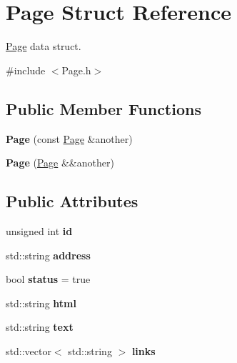 \hypertarget{structPage}{}\section{Page Struct Reference}
\label{structPage}


\hyperlink{structPage}{Page} data struct.  




{\ttfamily \#include $<$Page.\+h$>$}

\subsection*{Public Member Functions}
\begin{DoxyCompactItemize}
\item 
{\bfseries Page} (const \hyperlink{structPage}{Page} \&another)\hypertarget{structPage_a0029ba23e2303c20c550e201e24b2f7d}{}\label{structPage_a0029ba23e2303c20c550e201e24b2f7d}

\item 
{\bfseries Page} (\hyperlink{structPage}{Page} \&\&another)\hypertarget{structPage_a404fa3599cf2a9bfc900ca31f0bad9d2}{}\label{structPage_a404fa3599cf2a9bfc900ca31f0bad9d2}

\end{DoxyCompactItemize}
\subsection*{Public Attributes}
\begin{DoxyCompactItemize}
\item 
unsigned int {\bfseries id}\hypertarget{structPage_a316a1debabaa6db094c2d2f3b9f330e6}{}\label{structPage_a316a1debabaa6db094c2d2f3b9f330e6}

\item 
std\+::string {\bfseries address}\hypertarget{structPage_a50b1e124ae77b9494b00a7732f41f39f}{}\label{structPage_a50b1e124ae77b9494b00a7732f41f39f}

\item 
bool {\bfseries status} = true\hypertarget{structPage_a64c1ee9c0d6364bd65708b7cb60d0e91}{}\label{structPage_a64c1ee9c0d6364bd65708b7cb60d0e91}

\item 
std\+::string {\bfseries html}\hypertarget{structPage_aa5ef880ab4cf831a943f0664aea79012}{}\label{structPage_aa5ef880ab4cf831a943f0664aea79012}

\item 
std\+::string {\bfseries text}\hypertarget{structPage_a15f0adff4c097c8481fec60dadfd3622}{}\label{structPage_a15f0adff4c097c8481fec60dadfd3622}

\item 
std\+::vector$<$ std\+::string $>$ {\bfseries links}\hypertarget{structPage_a292e21121e0bd05fbc0bbd88f268e2d6}{}\label{structPage_a292e21121e0bd05fbc0bbd88f268e2d6}

\end{DoxyCompactItemize}


